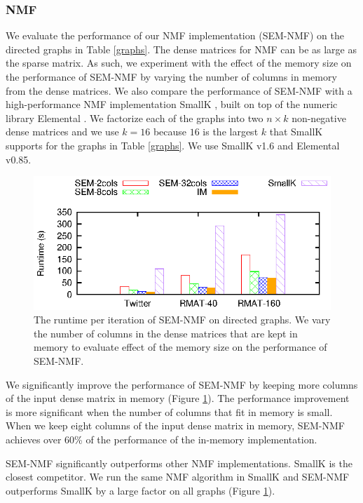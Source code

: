 \subsubsection{NMF}
We evaluate the performance of our NMF implementation (SEM-NMF) on the directed
graphs in Table \ref{graphs}. The dense matrices for NMF can be as large as
the sparse matrix. As such, we experiment with the effect of the memory size on
the performance of SEM-NMF by varying the number of columns in memory from
the dense matrices. We also compare the performance of SEM-NMF with
a high-performance NMF implementation SmallK \cite{SmallK}, built on top of
the numeric library Elemental \cite{elemental}. We factorize
each of the graphs into two $n \times k$ non-negative dense matrices and
we use $k=16$ because $16$ is the largest $k$ that SmallK supports for
the graphs in Table \ref{graphs}. We use SmallK v1.6 and Elemental v0.85.

\begin{figure}
	\begin{center}
		\footnotesize
		\includegraphics[scale=1]{SpMM_figs/NMF.eps}
		\caption{The runtime per iteration of SEM-NMF on directed graphs.
			We vary the number of columns in the dense matrices that are kept
			in memory to evaluate effect of the memory size on the performance
		of SEM-NMF.}
		\label{perf:NMF}
	\end{center}
\end{figure}

We significantly improve the performance of SEM-NMF by keeping more columns
of the input dense matrix in memory (Figure \ref{perf:NMF}). The performance
improvement is more significant when the number of columns that fit in memory
is small. When we keep eight columns of the input dense matrix in memory,
SEM-NMF achieves over 60\% of the performance of the in-memory implementation.

SEM-NMF significantly outperforms other NMF implementations.
SmallK is the closest competitor. We run the same NMF algorithm in SmallK and
SEM-NMF outperforms SmallK by a large factor on all graphs (Figure
\ref{perf:NMF}). 
